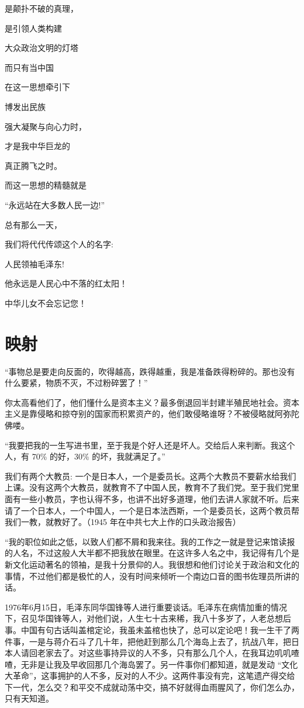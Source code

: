 \documentclass[11pt,twoside,a4paper]{book}
\theoremstyle{thmstyle} %
\theoremstyle{defstyle} %
\theoremstyle{prostyle} %
\begin{document}
是颠扑不破的真理，

是引领人类构建

大众政治文明的灯塔

而只有当中国

在这一思想牵引下

博发出民族

强大凝聚与向心力时，

才是我中华巨龙的

真正腾飞之时。

而这一思想的精髓就是

“永远站在大多数人民一边!”

总有那么一天，

我们将代代传颂这个人的名字:

人民领袖毛泽东!

他永远是人民心中不落的红太阳！

中华儿女不会忘记您！

\section{映射}
“事物总是要走向反面的，吹得越高，跌得越重，我是准备跌得粉碎的。那也没有什么要紧，物质不灭，不过粉碎罢了！”

你太高看他们了，他们懂什么是资本主义？最多倒退回半封建半殖民地社会。资本主义是靠侵略和掠夺别的国家而积累资产的，他们敢侵略谁呀？不被侵略就阿弥陀佛喽。

“我要把我的一生写进书里，至于我是个好人还是坏人。交给后人来判断。我这个人，有 70\% 的好，30\% 的坏，我就满足了。” ​

我们有两个大教员: 一个是日本人，一个是委员长。这两个大教员不要薪水给我们上课。没有这两个大教员，就教育不了中国人民，教育不了我们党。至于我们党里面有一些小教员，字也认得不多，也讲不出好多道理，他们去讲人家就不听。后来请了一个日本人，一个中国人，一个是日本法西斯，一个是委员长，这两个教员帮我们一教，就教好了。（1945 年在中共七大上作的口头政治报告）

“我的职位如此之低，以致人们都不屑和我来往。我的工作之一就是登记来馆读报的人名，不过这般人大半都不把我放在眼里。在这许多人名之中，我记得有几个是新文化运动著名的领袖，是我十分景仰的人。我很想和他们讨论关于政治和文化的事情，不过他们都是极忙的人，没有时间来倾听一个南边口音的图书佐理员所讲的话。

1976年6月15日，毛泽东同华国锋等人进行重要谈话。毛泽东在病情加重的情况下，召见华国锋等人，对他们说，人生七十古来稀，我八十多岁了，人老总想后事。中国有句古话叫盖棺定论，我虽未盖棺也快了，总可以定论吧！我一生干了两件事，一是与蒋介石斗了几十年，把他赶到那么几个海岛上去了，抗战八年，把日本人请回老家去了。对这些事持异议的人不多，只有那么几个人，在我耳边叽叽喳喳，无非是让我及早收回那几个海岛罢了。另一件事你们都知道，就是发动 “文化大革命”，这事拥护的人不多，反对的人不少。这两件事没有完，这笔遗产得交给下一代，怎么交？和平交不成就动荡中交，搞不好就得血雨腥风了，你们怎么办，只有天知道。
\end{document}
